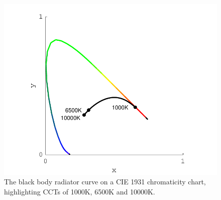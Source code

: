 \begin{figure}[htbp]
\includegraphics[max width=\textwidth]{figs/LitRev/BBR.pdf}
\caption{The black body radiator curve on a \gls{CIE} 1931 chromaticity chart, highlighting \glspl{CCT} of 1000K, 6500K and 10000K.}
\label{fig:BBR}
\end{figure}

\clearpage